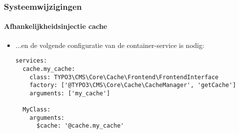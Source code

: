 
\begin{frame}[fragile]
	\frametitle{Systeemwijzigingen}
	\framesubtitle{Afhankelijkheidsinjectie cache}

	\lstset{basicstyle=\tiny\ttfamily}

	\begin{itemize}
		\item ...en de volgende configuratie van de container-service is nodig:
\begin{lstlisting}
services:
  cache.my_cache:
    class: TYPO3\CMS\Core\Cache\Frontend\FrontendInterface
    factory: ['@TYPO3\CMS\Core\Cache\CacheManager', 'getCache']
    arguments: ['my_cache']

  MyClass:
    arguments:
      $cache: '@cache.my_cache'
\end{lstlisting}

	\end{itemize}

\end{frame}


